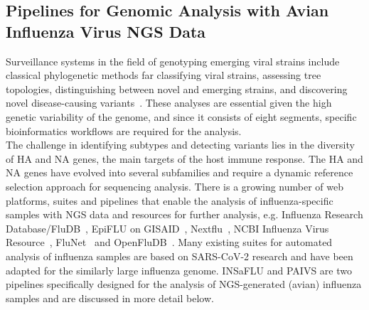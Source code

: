 \subsection{Pipelines for Genomic Analysis with Avian Influenza Virus NGS Data}\label{sec:2-aiv-pipelines}
Surveillance systems in the field of genotyping emerging viral strains include classical phylogenetic methods far classifying viral strains, assessing tree topologies, distinguishing between novel and emerging strains, and discovering novel disease-causing variants~\cite{koboldt2013next}. These analyses are essential given the high genetic variability of the genome, and since it consists of eight segments, specific bioinformatics workflows are required for the analysis. \\
The challenge in identifying subtypes and detecting variants lies in the diversity of \ac{HA} and \ac{NA} genes, the main targets of the host immune response. The \ac{HA} and \ac{NA} genes have evolved into several subfamilies and require a dynamic reference selection approach for sequencing analysis. There is a growing number of web platforms, suites and pipelines that enable the analysis of influenza-specific samples with \ac{NGS} data and resources for further analysis, e.g. Influenza Research Database/FluDB~\cite{zhang2017influenza}, EpiFLU on \ac{GISAID}~\cite{shu2017gisaid}, Nextflu~\cite{neher2015nextflu}, NCBI Influenza Virus Resource~\cite{bao2008influenza}, FluNet~\cite{flahault1998flunet} and OpenFluDB~\cite{liechti2010openfludb}. Many existing suites for automated analysis of influenza samples are based on \ac{SARS-CoV-2} research and have been adapted for the similarly large influenza genome. \ac{INSaFLU} and \ac{PAIVS} are two pipelines specifically designed for the analysis of \ac{NGS}-generated (avian) influenza samples and are discussed in more detail below.


